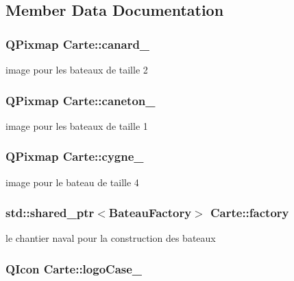 \subsection{Member Data Documentation}
\hypertarget{classCarte_aaa54051f62acfe29059fb0973d977828}{
\subsubsection[{canard\+\_\+}]{\setlength{\rightskip}{0pt plus 5cm}Q\+Pixmap Carte\+::canard\+\_\+\hspace{0.3cm}{\ttfamily [protected]}}}\label{classCarte_aaa54051f62acfe29059fb0973d977828}
image pour les bateaux de taille 2 \hypertarget{classCarte_a824ab30e6ce53cc9c65c8af8146867f0}{
\subsubsection[{caneton\+\_\+}]{\setlength{\rightskip}{0pt plus 5cm}Q\+Pixmap Carte\+::caneton\+\_\+\hspace{0.3cm}{\ttfamily [protected]}}}\label{classCarte_a824ab30e6ce53cc9c65c8af8146867f0}
image pour les bateaux de taille 1 \hypertarget{classCarte_a9077e065a5b672393b68afcbde4951f3}{
\subsubsection[{cygne\+\_\+}]{\setlength{\rightskip}{0pt plus 5cm}Q\+Pixmap Carte\+::cygne\+\_\+\hspace{0.3cm}{\ttfamily [protected]}}}\label{classCarte_a9077e065a5b672393b68afcbde4951f3}
image pour le bateau de taille 4 \hypertarget{classCarte_afbc674d4d0a924d3a73c6f3f966a723a}{
\subsubsection[{factory}]{\setlength{\rightskip}{0pt plus 5cm}std\+::shared\+\_\+ptr$<${\bf Bateau\+Factory}$>$ Carte\+::factory\hspace{0.3cm}{\ttfamily [protected]}}}\label{classCarte_afbc674d4d0a924d3a73c6f3f966a723a}
le chantier naval pour la construction des bateaux \hypertarget{classCarte_a8f5f0d81b5134126a52d338ea5d28dc6}{
\subsubsection[{logo\+Case\+\_\+}]{\setlength{\rightskip}{0pt plus 5cm}Q\+Icon Carte\+::logo\+Case\+\_\+\hspace{0.3cm}{\ttfamily [protected]}}}\label{classCarte_a8f5f0d81b5134126a52d338ea5d28dc6}
